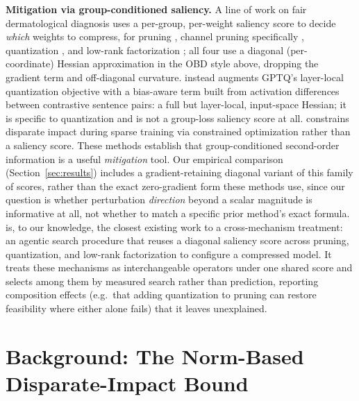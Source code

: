 \documentclass{article}
\begin{document}
\textbf{Mitigation via group-conditioned saliency.} A line of work on fair dermatological diagnosis uses a per-group, per-weight saliency score to decide \emph{which} weights to compress, for pruning \citep{wu2022fairprune}, channel pruning specifically \citep{kong2024channel}, quantization \citep{guo2024fairquantize}, and low-rank factorization \citep{guo2025fairlrf}; all four use a diagonal (per-coordinate) Hessian approximation in the OBD style above, dropping the gradient term and off-diagonal curvature. \citet{proskurina2025fairgptq} instead augments GPTQ's \citep{frantar2023gptq} layer-local quantization objective with a bias-aware term built from activation differences between contrastive sentence pairs: a full but layer-local, input-space Hessian; it is specific to quantization and is not a group-loss saliency score at all. \citet{hashemizadeh2024balancing} constrains disparate impact during sparse training via constrained optimization rather than a saliency score. These methods establish that group-conditioned second-order information is a useful \emph{mitigation} tool. Our empirical comparison (Section~\ref{sec:results}) includes a gradient-retaining diagonal variant of this family of scores, rather than the exact zero-gradient form these methods use, since our question is whether perturbation \emph{direction} beyond a scalar magnitude is informative at all, not whether to match a specific prior method's exact formula. \citet{guo2026faircompressagent} is, to our knowledge, the closest existing work to a cross-mechanism treatment: an agentic search procedure that reuses a diagonal saliency score across pruning, quantization, and low-rank factorization to configure a compressed model. It treats these mechanisms as interchangeable operators under one shared score and selects among them by measured search rather than prediction, reporting composition effects (e.g.\ that adding quantization to pruning can restore feasibility where either alone fails) that it leaves unexplained.

\section{Background: The Norm-Based Disparate-Impact Bound}
\label{sec:background}
\end{document}
